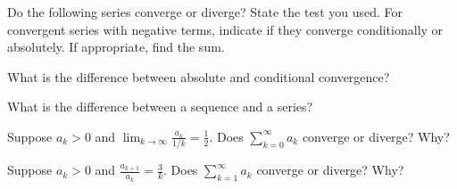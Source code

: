 \documentclass[12pt]{exam}
\begin{document}
\begin{questions}


\question Do the following series converge or diverge?  State the 
test you used.  For convergent series with negative terms, indicate if they
 converge conditionally or absolutely.  If appropriate,
find the sum.


\question
 What is the difference between absolute and conditional convergence?

\question What is the difference between a sequence and a series?

\question Suppose $a_k>0$ and $\displaystyle 
\lim_{k\to\infty}\frac{a_k}{1/k} =\frac {1}{2}$.  Does 
$\displaystyle \sum_{k=0}^\infty
a_k$ converge or diverge?  Why?

\question Suppose $a_k>0$ and $\displaystyle \frac{a_{k+1}}{a_k} = \frac{3}{k}$.
Does $\displaystyle \sum_{k=1}^\infty a_k$ converge or diverge?  Why?

\end{questions}
\end{document}
